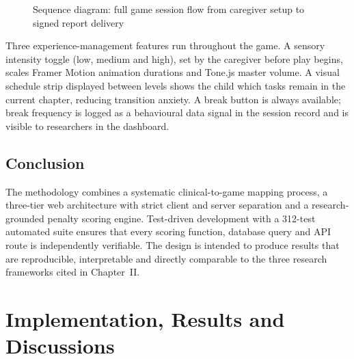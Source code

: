 \documentclass[12pt,a4paper,oneside]{report}
\begin{document}
\begin{figure}[b]
{}
  \caption{Sequence diagram: full game session flow from caregiver setup to signed report delivery}
  \label{fig:seqsession}
\end{figure}

Three experience-management features run throughout the game. A sensory intensity toggle (low, medium and high), set by the caregiver before play begins, scales Framer Motion animation durations and Tone.js master volume. A visual schedule strip displayed between levels shows the child which tasks remain in the current chapter, reducing transition anxiety. A break button is always available; break frequency is logged as a behavioural data signal in the session record and is visible to researchers in the dashboard.

\section{Conclusion}

The methodology combines a systematic clinical-to-game mapping process, a three-tier web architecture with strict client and server separation and a research-grounded penalty scoring engine. Test-driven development with a 312-test automated suite ensures that every scoring function, database query and API route is independently verifiable. The design is intended to produce results that are reproducible, interpretable and directly comparable to the three research frameworks cited in Chapter~II.

\clearpage
\chapter{Implementation, Results and Discussions}
\end{document}

